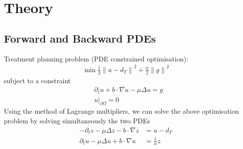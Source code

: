 \documentclass{article}  %
\begin{document}
\section{Theory}













\subsection{Forward and Backward PDEs}

Treatment planning problem (PDE constrained optimisation):
%
\begin{align} 
    \min \frac{1}{2} {\lVert u - d_T \rVert}^2 + \frac{\alpha}{2} {\lVert g \rVert}^2
\end{align}
%
subject to a constraint
%
\begin{align} 
    &\partial_t u + b \cdot \nabla u - \mu \Delta u = g\\
    &{u \rvert}_{\partial \Omega} = 0
\end{align}
%
Using the method of Lagrange multipliers, we can solve the above optimisation problem by solving simultaneously the two PDEs
%
\begin{align}
    - \partial_t z - \mu \Delta z - b \cdot \nabla z &= u - d_T\\
    \partial_t u - \mu \Delta u + b \cdot \nabla u &= \frac{1}{\alpha} z 
\end{align}
%
\end{document}
